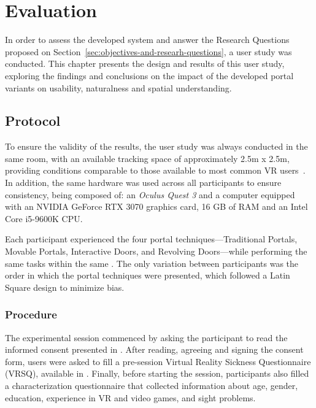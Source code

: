 
%

\chapter{Evaluation}
\label{cha:evaluation}

In order to assess the developed system and answer the Research Questions proposed on Section~\ref{sec:objectives-and-researh-questions},
a user study was conducted. This chapter presents the design and results of this user study, exploring the findings and conclusions on 
the impact of the developed portal variants on usability, naturalness and spatial understanding.


\section{Protocol}
\label{sec:protocol}

To ensure the validity of the results, the user study was always conducted in the same room, with an available tracking space of 
approximately 2.5m x 2.5m, providing conditions comparable to those available to most common \gls{VR} users~\cite{}. In addition, 
the same hardware was used across all participants to ensure consistency, being composed of: an \textit{Oculus Quest 3}  and 
a computer equipped with an NVIDIA GeForce RTX 3070 graphics card, 16 GB of RAM and an Intel Core i5-9600K CPU.

Each participant experienced the four portal 
techniques—Traditional Portals, Movable Portals, Interactive Doors, and Revolving Doors—while performing the same tasks within 
the same . The only variation between participants was the order in which the portal techniques were presented, which 
followed a Latin Square design to minimize bias.

\subsection{Procedure}
\label{sec:procedure}

The experimental session commenced by asking the participant to read the informed consent presented in . After reading, 
agreeing and signing the consent form, users were asked to fill a pre-session Virtual Reality Sickness Questionnaire (VRSQ), available in 
. Finally, before starting the session, participants also filled a characterization questionnaire that collected 
information about age, gender, education, experience in VR and video games, and sight problems.

